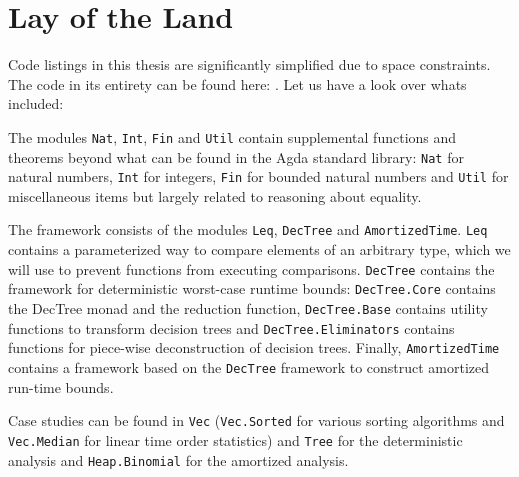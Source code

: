 
\chapter{Lay of the Land}
Code listings in this thesis are significantly simplified due to space constraints. The code in its entirety can be found here: . Let us have a look over whats included:

The modules \texttt{Nat}, \texttt{Int}, \texttt{Fin} and \texttt{Util} contain supplemental functions and theorems beyond what can be found in the Agda standard library: \texttt{Nat} for natural numbers, \texttt{Int} for integers, \texttt{Fin} for bounded natural numbers and \texttt{Util} for miscellaneous items but largely related to reasoning about equality.

The framework consists of the modules \texttt{Leq}, \texttt{DecTree} and \texttt{AmortizedTime}. \texttt{Leq} contains a parameterized way to compare elements of an arbitrary type, which we will use to prevent functions from executing comparisons. \texttt{DecTree} contains the framework for deterministic worst-case runtime bounds: \texttt{DecTree.Core} contains the DecTree monad and the reduction function, \texttt{DecTree.Base} contains utility functions to transform decision trees and \texttt{DecTree.Eliminators} contains functions for piece-wise deconstruction of decision trees. Finally, \texttt{AmortizedTime} contains a framework based on the \texttt{DecTree} framework to construct amortized run-time bounds.

Case studies can be found in \texttt{Vec} (\texttt{Vec.Sorted} for various sorting algorithms and \texttt{Vec.Median} for linear time order statistics) and \texttt{Tree} for the deterministic analysis and \texttt{Heap.Binomial} for the amortized analysis.